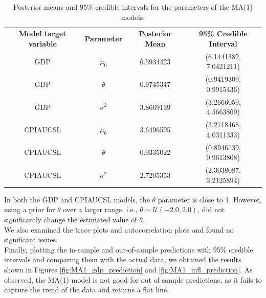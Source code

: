 \begin{table}[H]
    \centering
    \begin{tabular}{c|c|c|c}
        \textbf{Model target variable } & \textbf{Parameter } & \textbf{Posterior Mean } & \textbf{95\% Credible Interval } \\
        \cline{1-4}
        GDP      & $\mu_0$    & 6.5934423 & (6.1441382, 7.0421211) \\
        GDP      & $\theta$   & 0.9745347 & (0.9419309, 0.9915436) \\
        GDP      & $\sigma^2$ & 3.8669139 & (3.2666059, 4.5663869) \\
        CPIAUCSL & $\mu_0$    & 3.6496595 & (3.2718468, 4.0311333) \\
        CPIAUCSL & $\theta$   & 0.9335022 & (0.8946139, 0.9613808) \\
        CPIAUCSL & $\sigma^2$ & 2.7205353 & (2.3038087, 3.2125894) \\
    \end{tabular}
    \caption{Posterior means and 95\% credible intervals for the parameters of the MA(1) models.}
    \label{tab:MA1_posteriors}
\end{table}
In both the GDP and CPIAUCSL models, the $\theta$ parameter is close to 1. However, using a prior for $\theta$ over a larger range, i.e., $\theta \sim \mathcal{U}(-2.0, 2.0)$, did not significantly change the estimated value of $\theta$. \\
We also examined the trace plots and autocorrelation plots and found no significant issues. \\
Finally, plotting the in-sample and out-of-sample predictions with 95\% credible intervals and comparing them with the actual data, we obtained the results shown in Figures \ref{fig:MA1_gdp_prediction} and \ref{fig:MA1_infl_prediction}. As observed, the MA(1) model is not good for out of sample predictions, as it fails to capture the trend of the data and returns a flat line.
